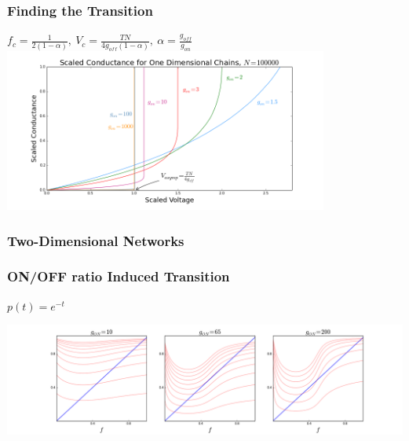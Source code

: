 \documentclass[mathserif]{beamer}
\begin{document}
\begin{frame}
\frametitle{Finding the Transition}
\centering
$f_c = \frac{1}{2(1-\alpha)}, \: V_c = \frac{TN}{4g_{off}(1-\alpha)},
 \: \alpha = \frac{g_{off}}{g_{on}}$
\includegraphics[width=0.8\textwidth]{1D_Cond.png}

\end{frame}

\begin{frame}
\frametitle{Two-Dimensional Networks}
\begin{center}
\end{center}

\end{frame}


\begin{frame}
\frametitle{ON/OFF ratio Induced Transition}
$p(t) = e^{-t}$
\begin{center}

\includegraphics[width=\textwidth]{SC_2D_Exponential_set.png}
\end{center}
\end{frame}
\end{document}
